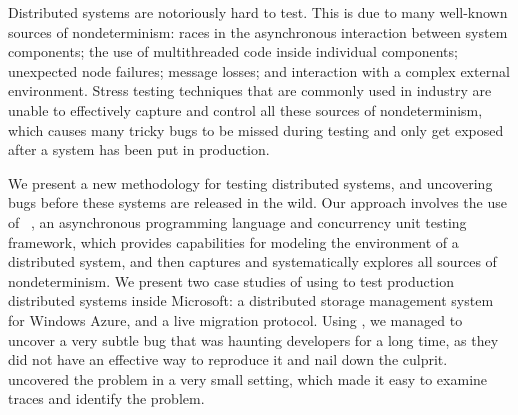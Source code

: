 Distributed systems are notoriously hard to test. This is due to many well-known sources of nondeterminism: races in the asynchronous interaction between system components; the use of multithreaded code inside individual components; unexpected node failures; message losses; and interaction with a complex external environment. Stress testing techniques that are commonly used in industry are unable to effectively capture and control all these sources of nondeterminism, which causes many tricky bugs to be missed during testing and only get exposed after a system has been put in production.

We present a new methodology for testing distributed systems, and uncovering bugs before these systems are released in the wild. Our approach involves the use of \psharp~\cite{deligiannis2015psharp}, an asynchronous programming language and concurrency unit testing framework, which provides capabilities for modeling the environment of a distributed system, and then captures and systematically explores all sources of nondeterminism. We present two case studies of using \psharp to test production distributed systems inside Microsoft: a distributed storage management system for Windows Azure, and a live migration protocol. Using \psharp, we managed to uncover a very subtle bug that was haunting developers for a long time, as they did not have an effective way to reproduce it and nail down the culprit. \psharp uncovered the problem in a very small setting, which made it easy to examine traces and identify the problem.
